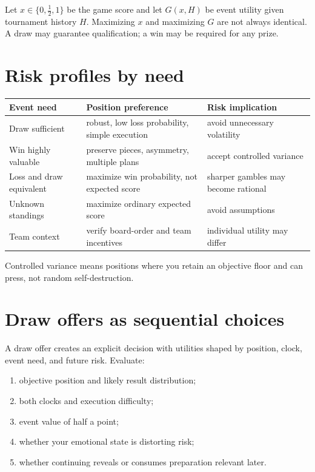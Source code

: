 Let $x\in\{0,\tfrac12,1\}$ be the game score and let $G(x,H)$ be event utility given tournament history $H$. Maximizing $x$ and maximizing $G$ are not always identical. A draw may guarantee qualification; a win may be required for any prize.

\section{Risk profiles by need}
\begin{center}
\begin{tabularx}{.94\textwidth}{p{}YY}
\toprule
\textbf{Event need} & \textbf{Position preference} & \textbf{Risk implication}\\
\midrule
Draw sufficient & robust, low loss probability, simple execution & avoid unnecessary volatility\\
Win highly valuable & preserve pieces, asymmetry, multiple plans & accept controlled variance\\
Loss and draw equivalent & maximize win probability, not expected score & sharper gambles may become rational\\
Unknown standings & maximize ordinary expected score & avoid assumptions\\
Team context & verify board-order and team incentives & individual utility may differ\\
\bottomrule
\end{tabularx}
\end{center}

Controlled variance means positions where you retain an objective floor and can press, not random self-destruction.

\section{Draw offers as sequential choices}
A draw offer creates an explicit decision with utilities shaped by position, clock, event need, and future risk. Evaluate:

\begin{enumerate}[label=\textbf{\arabic*.},leftmargin=2em]
\item objective position and likely result distribution;
\item both clocks and execution difficulty;
\item event value of half a point;
\item whether your emotional state is distorting risk;
\item whether continuing reveals or consumes preparation relevant later.
\end{enumerate}

